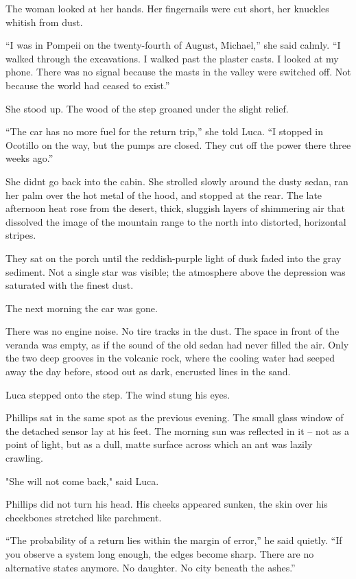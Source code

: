 \documentclass[
  ngerman,
]{article}
\begin{document}
The woman looked at her hands. Her fingernails were cut short, her
knuckles whitish from dust.

``I was in Pompeii on the twenty-fourth of August, Michael,'' she said
calmly. ``I walked through the excavations. I walked past the plaster
casts. I looked at my phone. There was no signal because the masts in
the valley were switched off. Not because the world had ceased to
exist.''

She stood up. The wood of the step groaned under the slight relief.

``The car has no more fuel for the return trip,'' she told Luca. ``I
stopped in Ocotillo on the way, but the pumps are closed. They cut off
the power there three weeks ago.''

She didn\textquotesingle t go back into the cabin. She strolled slowly
around the dusty sedan, ran her palm over the hot metal of the hood, and
stopped at the rear. The late afternoon heat rose from the desert,
thick, sluggish layers of shimmering air that dissolved the image of the
mountain range to the north into distorted, horizontal stripes.

They sat on the porch until the reddish-purple light of dusk faded into
the gray sediment. Not a single star was visible; the atmosphere above
the depression was saturated with the finest dust.

The next morning the car was gone.

There was no engine noise. No tire tracks in the dust. The space in
front of the veranda was empty, as if the sound of the old sedan had
never filled the air. Only the two deep grooves in the volcanic rock,
where the cooling water had seeped away the day before, stood out as
dark, encrusted lines in the sand.

Luca stepped onto the step. The wind stung his eyes.

Phillips sat in the same spot as the previous evening. The small glass
window of the detached sensor lay at his feet. The morning sun was
reflected in it -- not as a point of light, but as a dull, matte surface
across which an ant was lazily crawling.

"She will not come back," said Luca.

Phillips did not turn his head. His cheeks appeared sunken, the skin
over his cheekbones stretched like parchment.

``The probability of a return lies within the margin of error,'' he said
quietly. ``If you observe a system long enough, the edges become sharp.
There are no alternative states anymore. No daughter. No city beneath
the ashes.''
\end{document}
